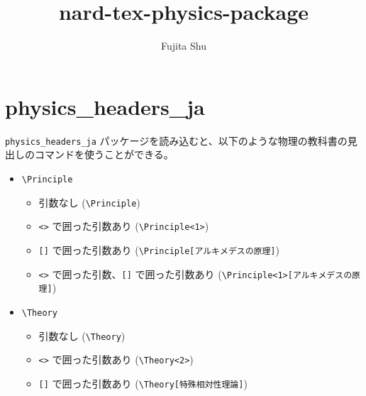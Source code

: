 \documentclass[oneside,10pt,a4paper]{jsarticle}
\title{nard-tex-physics-package}
\author{Fujita Shu}
\begin{document}
  \maketitle

  \section{physics\_headers\_ja}

  \verb|physics_headers_ja| パッケージを読み込むと、以下のような物理の教科書の見出しのコマンドを使うことができる。

  \begin{itemize}
    \item \verb|\Principle|
      \begin{itemize}
        \item 引数なし (\verb|\Principle|)
          \begin{quote}
            \Principle
          \end{quote}
        \item \verb|<>| で囲った引数あり (\verb|\Principle<1>|)
          \begin{quote}
          \end{quote}
        \item \verb|[]| で囲った引数あり (\verb|\Principle[アルキメデスの原理]|)
          \begin{quote}
            \Principle[アルキメデスの原理]
          \end{quote}
        \item \verb|<>| で囲った引数、\verb|[]| で囲った引数あり (\verb|\Principle<1>[アルキメデスの原理]|)
          \begin{quote}
          \end{quote}
      \end{itemize}
    \item \verb|\Theory|
      \begin{itemize}
        \item 引数なし (\verb|\Theory|)
          \begin{quote}
            \Theory
          \end{quote}
        \item \verb|<>| で囲った引数あり (\verb|\Theory<2>|)
          \begin{quote}
          \end{quote}
        \item \verb|[]| で囲った引数あり (\verb|\Theory[特殊相対性理論]|)

\end{itemize}
\end{itemize}
\end{document}

